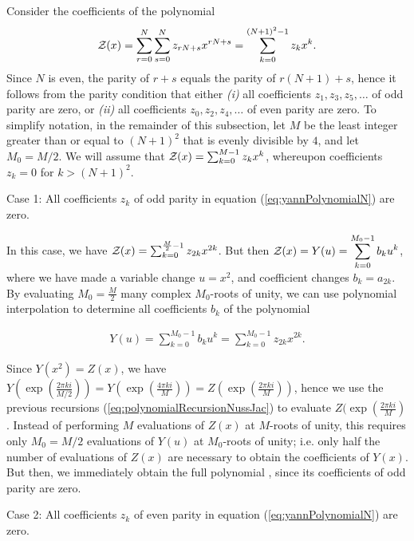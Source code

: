 Consider the coefficients of the polynomial
\begin{align}
\label{eq:yannPolynomialN}
\emZ{} = \sum_{r=0}^{N} \sum_{s=0}^{N} z_{rN+s} x^{rN+s}
= \sum_{k=0}^{(N+1)^2-1} z_k x^k.
\end{align}
Since $N$ is even, the parity of $r+s$ equals the parity of
$r(N+1)+s$, hence  it follows from the parity condition that either
{\em (i)} all coefficients $z_1,z_3,z_5,\dots$ of odd parity are zero,
or {\em (ii)} all coefficients $z_0,z_2,z_4,\dots$ of even parity are zero.
To simplify notation, in the remainder of this subsection, let $M$ be
the least integer greater than or equal to $(N+1)^2$ that is evenly divisible
by $4$, and let $M_0=M/2$. We will assume that ${\mathcal Z}_{}(x) = \sum_{k=0}^{M-1}
z_k x^k$, whereupon coefficients $z_k=0$ for $k>(N+1)^2$.
\smallskip

\noindent
{\sc Case 1}: All coefficients $z_k$ of odd parity in
equation (\ref{eq:yannPolynomialN}) are zero.
\smallskip

\noindent
In this case, we have
${\mathcal Z}_{}(x) = \sum_{k=0}^{\frac{M}{2}-1} z_{2k} x^{2k}$. But then
${\mathcal Z}_{}(x) = Y(u) = \displaystyle\sum_{k=0}^{M_0-1} b_k u^k$,
where we have made a variable change $u=x^2$, and coefficient changes
$b_k = a_{2k}$.
By evaluating $M_0=\frac{M}{2}$ many complex
$M_0$-roots of unity, we can
use polynomial interpolation to determine all coefficients $b_k$ of
the polynomial

\begin{align}
Y(u) = \displaystyle\sum_{k=0}^{M_0-1} b_k u^k =
\displaystyle\sum_{k=0}^{M_0-1} z_{2k} x^{2k}.
\end{align}


Since $Y(x^2)=Z(x)$, we have
$Y(\exp(\frac{2\pi k i}{M/2})) =
Y(\exp(\frac{4\pi k i}{M})) =
Z(\exp(\frac{2\pi k i}{M}))$, hence we
use the previous recursions (\ref{eq:polynomialRecursionNussJac})
to evaluate $Z(\exp(\frac{2\pi ki}{M})$.  Instead of
performing $M$ evaluations of $Z(x)$ at $M$-roots of unity,
this requires only $M_0=M/2$ evaluations of $Y(u)$ at
$M_0$-roots of unity; i.e. only half the number of
evaluations of $Z(x)$ are necessary to
obtain the coefficients of $Y(x)$. But then, we immediately obtain the
full polynomial \emZ{}, since its coefficients of odd  parity are zero.
\medskip

\noindent
{\sc Case 2}: All coefficients $z_k$ of even parity in
equation (\ref{eq:yannPolynomialN}) are zero.
\smallskip

